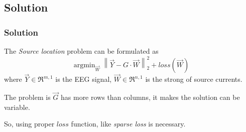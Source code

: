 \documentclass{beamer}
\begin{document}
\subsection{Solution}
\begin{frame}
    \frametitle{Solution}
    The \emph{Source location} problem can be formulated as
    \begin{equation}
        \mathop{\arg\min}_{\vec{W}}
        \left\lVert {\vec{Y} - G \cdot \vec{W}} \right\rVert ^{2} _{2} + loss(\vec{W})
    \end{equation}
    where $\vec{Y} \in \mathfrak{R}^{m, 1}$ is the EEG signal, $\vec{W} \in \mathfrak{R}^{n, 1}$ is the strong of source currents.

    The problem is $\vec{G}$ has more rows than columns, it makes the solution can be variable.

    So, using proper $loss$ function, like \emph{sparse loss} is necessary.
\end{frame}
\end{document}
